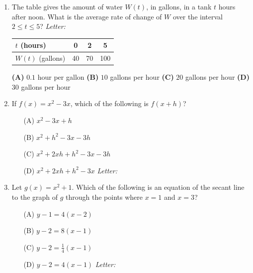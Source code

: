 \documentclass[10pt]{article}
\begin{document}
\begin{enumerate}[leftmargin=1.9em, itemsep=12pt]

\item The table gives the amount of water $W(t)$, in gallons, in a tank $t$ hours after noon.
      What is the average rate of change of $W$ over the interval $2 \le t \le 5$? \hfill\textit{Letter:}~\gradedblank[id=ap1, type=choice, points=1, answer=B]{0.42in}{13pt}

      \smallskip
      \begin{center}
      \renewcommand{\arraystretch}{1.2}
      \begin{tabular}{|l|c|c|c|}
      \hline
      $t$ (hours)     & 0  & 2  & 5   \\ \hline
      $W(t)$ (gallons) & 40 & 70 & 100 \\ \hline
      \end{tabular}
      \end{center}

      \textbf{(A)} $0.1$ hour per gallon \hspace{1.2em} \textbf{(B)} $10$ gallons per hour \hspace{1.2em}
      \textbf{(C)} $20$ gallons per hour \hspace{1.2em} \textbf{(D)} $30$ gallons per hour

\item If $f(x) = x^2 - 3x$, which of the following is $f(x + h)$?
      \begin{enumerate}[leftmargin=2.6em, itemsep=2pt]
        \item[(A)] $x^2 - 3x + h$
        \item[(B)] $x^2 + h^2 - 3x - 3h$
        \item[(C)] $x^2 + 2xh + h^2 - 3x - 3h$
        \item[(D)] $x^2 + 2xh + h^2 - 3x$ \hfill\textit{Letter:}~\gradedblank[id=ap2, type=choice, points=1, answer=C]{0.42in}{13pt}
      \end{enumerate}

\item Let $g(x) = x^2 + 1$. Which of the following is an equation of the secant line to the
      graph of $g$ through the points where $x = 1$ and $x = 3$?
      \begin{enumerate}[leftmargin=2.6em, itemsep=2pt]
        \item[(A)] $y - 1 = 4(x - 2)$
        \item[(B)] $y - 2 = 8(x - 1)$
        \item[(C)] $y - 2 = \tfrac{1}{4}(x - 1)$
        \item[(D)] $y - 2 = 4(x - 1)$ \hfill\textit{Letter:}~\gradedblank[id=ap3, type=choice, points=1, answer=D]{0.42in}{13pt}
      \end{enumerate}


\end{enumerate}
\end{document}

